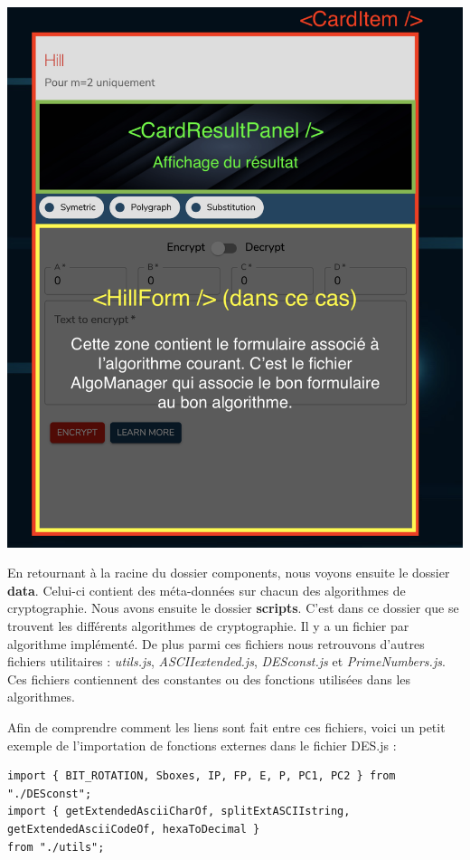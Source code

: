 \documentclass{article}
\begin{document}
\bigskip
\begin{center}
  \includegraphics[scale=0.3]{components3.png}
\end{center}
\bigskip

En retournant à la racine du dossier components, nous voyons ensuite le dossier \textbf{data}. Celui-ci contient des méta-données sur chacun des algorithmes de cryptographie. 
Nous avons ensuite le dossier \textbf{scripts}. C'est dans ce dossier que se trouvent les différents algorithmes de cryptographie. Il y a un fichier par algorithme implémenté. De plus parmi ces fichiers nous retrouvons d'autres fichiers utilitaires : \textit{utils.js}, \textit{ASCIIextended.js},\textit{ DESconst.js} et \textit{PrimeNumbers.js}. Ces fichiers contiennent des constantes ou des fonctions utilisées dans les algorithmes.

Afin de comprendre comment les liens sont fait entre ces fichiers, voici un petit exemple de l'importation de fonctions externes dans le fichier DES.js :

\begin{verbatim}
import { BIT_ROTATION, Sboxes, IP, FP, E, P, PC1, PC2 } from "./DESconst";
import { getExtendedAsciiCharOf, splitExtASCIIstring, getExtendedAsciiCodeOf, hexaToDecimal }
from "./utils";
\end{verbatim}
\end{document}
